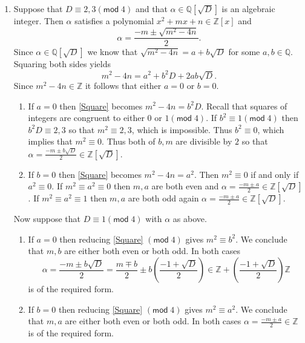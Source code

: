 \documentclass[12pt]{article}
\renewcommand{\pmod}[1]{\left(\mathsf{mod}\;#1\right)}
\begin{document}
\begin{enumerate}
\item %
Suppose that $D\equiv 2,3\pmod{4}$ and that
$\alpha\in\mathbb{Q}\left[\sqrt{D}\right]$ is an algebraic
integer. Then $\alpha$ satisfies a polynomial
$x^2+mx+n\in\mathbb{Z}\left[x\right]$ and
\begin{equation}\label{Alpha}
\alpha=\frac{-m\pm\sqrt{m^2-4n}}{2}.
\end{equation}
Since $\alpha\in\mathbb{Q}\left[\sqrt{D}\right]$ we know that
$\sqrt{m^2-4n}=a+b\sqrt{D}$ for some $a,b\in\mathbb{Q}$.
Squaring both sides yields
\begin{equation}\label{Square}
m^2-4n=a^2+b^2D+2ab\sqrt{D}.
\end{equation}
Since $m^2-4n\in\mathbb{Z}$
it follows that either $a=0$ or $b=0$.
\begin{enumerate}
\item If $a=0$ then \autoref{Square}
becomes $m^2-4n=b^2D$. Recall that squares
of integers are congruent to either $0$ or $1\pmod{4}$.
If $b^2\equiv 1\pmod{4}$ then $b^2D\equiv 2,3$ so that $m^2\equiv 2,3$,
which is impossible. Thus $b^2\equiv 0$, which implies that
$m^2\equiv 0$. Thus both of $b,m$ are divisible by $2$ so that
$\alpha=\frac{-m\pm b\sqrt{D}}{2}\in\mathbb{Z}\left[\sqrt{D}\right]$.
\item If $b=0$ then \autoref{Square} becomes
$m^2-4n=a^2$. Then $m^2\equiv 0$ if and only if $a^2\equiv 0$.
If $m^2\equiv a^2\equiv 0$ then $m,a$ are both even
and $\alpha=\frac{-m\pm a}{2}
\in\mathbb{Z}\left[\sqrt{D}\right]$.
If $m^2\equiv a^2\equiv 1$ then $m,a$ are both odd
again $\alpha=\frac{-m\pm a}{2}
\in\mathbb{Z}\left[\sqrt{D}\right]$.
\end{enumerate}

Now suppose that $D\equiv 1\pmod{4}$ with $\alpha$ as above.
\begin{enumerate}
\item If $a=0$ then reducing \autoref{Square} $\pmod{4}$
gives $m^2\equiv b^2$. We conclude that $m,b$ are either
both even or both odd. In both cases
\[\alpha=\frac{-m\pm b\sqrt{D}}{2}
=\frac{m\mp b}{2}\pm b\left(\frac{-1+\sqrt{D}}{2}\right)
\in\mathbb{Z}+\left(\frac{-1+\sqrt{D}}{2}\right)\mathbb{Z}\]
is of the required form.
\item If $b=0$ then reducing \autoref{Square} $\pmod{4}$
gives $m^2\equiv a^2$. We conclude that $m,a$ are either
both even or both odd. In both cases
$\alpha=\frac{-m\pm a}{2}\in\mathbb{Z}$ is of the required form.
\end{enumerate}


\end{enumerate}
\end{document}
